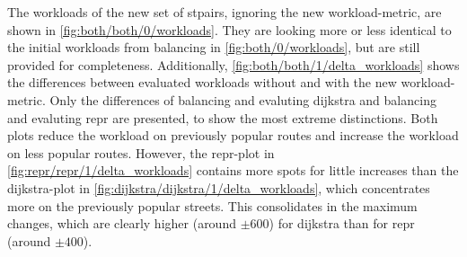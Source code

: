         The workloads of the new set of \glspl{stpair}, ignoring the new workload-\gls{metric}, are shown in \vref{fig:both/both/0/workloads}.
        They are looking more or less identical to the initial workloads from \gls{balancing} in \vref{fig:both/0/workloads}, but are still provided for completeness.
        Additionally, \cref{fig:both/both/1/delta_workloads} shows the differences between evaluated workloads without and with the new workload-\gls{metric}.
        Only the differences of \gls{balancing} and evaluting \gls{dijkstra} and \gls{balancing} and evaluting \gls{repr} are presented, to show the most extreme distinctions.
        Both plots reduce the workload on previously popular routes and increase the workload on less popular routes.
        However, the \gls{repr}-plot in \cref{fig:repr/repr/1/delta_workloads} contains more spots for little increases than the \gls{dijkstra}-plot in \cref{fig:dijkstra/dijkstra/1/delta_workloads}, which concentrates more on the previously popular streets.
        This consolidates in the maximum changes, which are clearly higher (around $\pm 600$) for \gls{dijkstra} than for \gls{repr} (around $\pm 400$).

